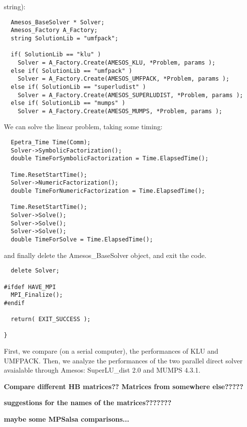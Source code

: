 \documentclass[11pt]{SANDreport}
\begin{document}
string):
\begin{verbatim}  
  Amesos_BaseSolver * Solver;
  Amesos_Factory A_Factory;
  string SolutionLib = "umfpack";

  if( SolutionLib == "klu" ) 
    Solver = A_Factory.Create(AMESOS_KLU, *Problem, params );
  else if( SolutionLib == "umfpack" )
    Solver = A_Factory.Create(AMESOS_UMFPACK, *Problem, params );
  else if( SolutionLib == "superludist" )
    Solver = A_Factory.Create(AMESOS_SUPERLUDIST, *Problem, params );
  else if( SolutionLib == "mumps" )
    Solver = A_Factory.Create(AMESOS_MUMPS, *Problem, params );
\end{verbatim}
We can solve the linear problem, taking some timing:
\begin{verbatim}  
  Epetra_Time Time(Comm);      
  Solver->SymbolicFactorization();
  double TimeForSymbolicFactorization = Time.ElapsedTime();
  
  Time.ResetStartTime();  
  Solver->NumericFactorization();
  double TimeForNumericFactorization = Time.ElapsedTime();
   
  Time.ResetStartTime();
  Solver->Solve();
  Solver->Solve();
  Solver->Solve();
  double TimeForSolve = Time.ElapsedTime();
\end{verbatim}
and finally delete the Amesos\_BaseSolver object, and exit the code.

\begin{verbatim}  
  delete Solver;
    
#ifdef HAVE_MPI
  MPI_Finalize();
#endif

  return( EXIT_SUCCESS );

}
\end{verbatim}

First, we compare (on a serial computer), the performances of
KLU and UMFPACK. Then, we analyze the performances of the two parallel
direct solver avaialable through Amesos: SuperLU\_dist 2.0 and MUMPS
4.3.1.


{\bf Compare different HB matrices?? Matrices from somewhere else?????}

{\bf suggestions for the names of the matrices???????}

{\bf maybe some MPSalsa comparisons...}



\end{document}
